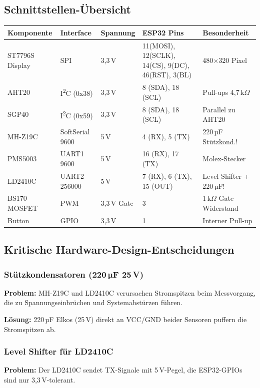\documentclass[a4paper,11pt]{article}
\begin{document}
\subsection{Schnittstellen-Übersicht}

\begin{longtable}{p{2.2cm} p{2cm} p{1.5cm} p{3cm} p{3.5cm}}
\toprule
\rowcolor{tableheader}
\textbf{Komponente} & \textbf{Interface} & \textbf{Spannung} & \textbf{ESP32 Pins} & \textbf{Besonderheit} \\
\midrule
\endhead

ST7796S Display & SPI & 3,3\,V & 11(MOSI), 12(SCLK), 14(CS), 9(DC), 46(RST), 3(BL) & 480$\times$320 Pixel \\
\midrule
AHT20 & I\textsuperscript{2}C (0x38) & 3,3\,V & 8 (SDA), 18 (SCL) & Pull-ups 4,7\,k$\Omega$ \\
\midrule
SGP40 & I\textsuperscript{2}C (0x59) & 3,3\,V & 8 (SDA), 18 (SCL) & Parallel zu AHT20 \\
\midrule
MH-Z19C & SoftSerial 9600 & 5\,V & 4 (RX), 5 (TX) & 220\,µF Stützkond.! \\
\midrule
PMS5003 & UART1 9600 & 5\,V & 16 (RX), 17 (TX) & Molex-Stecker \\
\midrule
LD2410C & UART2 256000 & 5\,V & 7 (RX), 6 (TX), 15 (OUT) & Level Shifter + 220\,µF! \\
\midrule
BS170 MOSFET & PWM & 3,3\,V Gate & 3 & 1\,k$\Omega$ Gate-Widerstand \\
\midrule
Button & GPIO & 3,3\,V & 1 & Interner Pull-up \\

\bottomrule
\end{longtable}

\subsection{Kritische Hardware-Design-Entscheidungen}

\subsubsection{Stützkondensatoren (220\,µF 25\,V)}
\textbf{Problem:} MH-Z19C und LD2410C verursachen Stromspitzen beim Messvorgang, die zu Spannungseinbrüchen und Systemabstürzen führen.

\textbf{Lösung:} 220\,µF Elkos (25\,V) direkt an VCC/GND beider Sensoren puffern die Stromspitzen ab.

\subsubsection{Level Shifter für LD2410C}
\textbf{Problem:} Der LD2410C sendet TX-Signale mit 5\,V-Pegel, die ESP32-GPIOs sind nur 3,3\,V-tolerant.
\end{document}
